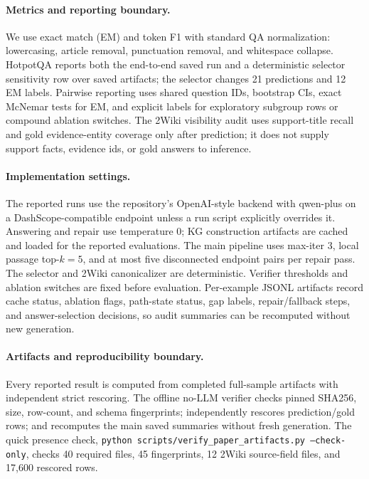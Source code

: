 \documentclass[runningheads,a4paper]{llncs}
\begin{document}
\paragraph{Metrics and reporting boundary.}
We use exact match (EM) and token F1 with standard QA normalization:
lowercasing, article removal, punctuation removal, and whitespace collapse.
HotpotQA reports both the end-to-end saved run and a deterministic selector
sensitivity row over saved artifacts; the selector changes 21 predictions and
12 EM labels. Pairwise reporting uses shared
question IDs, bootstrap CIs, exact McNemar tests for EM, and explicit labels for
exploratory subgroup rows or compound ablation switches. The 2Wiki visibility
audit uses support-title recall and gold evidence-entity coverage only after
prediction; it does not supply support facts, evidence ids, or gold answers to
inference.

\paragraph{Implementation settings.}
The reported runs use the repository's OpenAI-style backend with qwen-plus on a
DashScope-compatible endpoint unless a run script explicitly overrides it.
Answering and repair use temperature 0; KG construction artifacts are cached
and loaded for the reported evaluations. The main pipeline uses max-iter 3,
local passage top-$k=5$, and at most five disconnected endpoint pairs per
repair pass. The selector and 2Wiki canonicalizer are deterministic. Verifier
thresholds and ablation switches are fixed before evaluation. Per-example JSONL
artifacts record cache status, ablation flags, path-state status, gap labels,
repair/fallback steps, and
answer-selection decisions, so audit summaries can be recomputed without new
generation.

\paragraph{Artifacts and reproducibility boundary.}
Every reported result is computed from completed full-sample artifacts with
independent strict rescoring. The offline no-LLM verifier checks pinned SHA256,
size, row-count, and schema fingerprints; independently rescores prediction/gold
rows; and recomputes the main saved summaries without fresh generation. The
quick presence check,
\texttt{python scripts/verify\_paper\_artifacts.py --check-only}, checks 40
required files, 45 fingerprints, 12 2Wiki source-field files, and 17,600
rescored rows.
\end{document}
